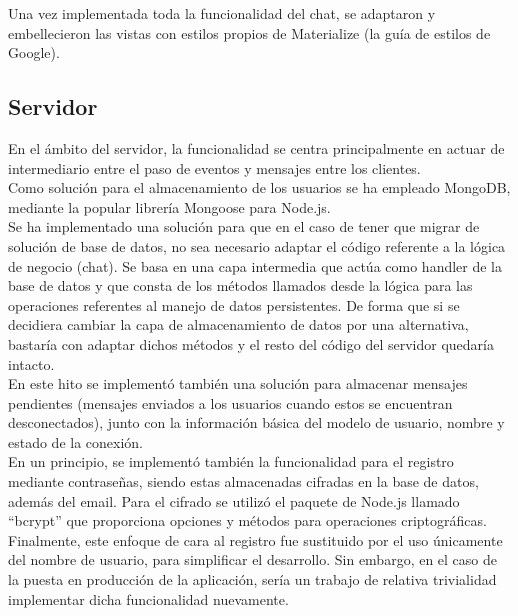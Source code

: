 Una vez implementada toda la funcionalidad del chat, se adaptaron y embellecieron las vistas con estilos propios de Materialize \cite{MaterializeGoogle} (la guía de estilos de Google). \\

\subsection{Servidor}

En el ámbito del servidor, la funcionalidad se centra principalmente en actuar de intermediario entre el paso de eventos y mensajes entre los clientes. \\ 

Como solución para el almacenamiento de los usuarios se ha empleado MongoDB, mediante la popular librería Mongoose para Node.js. \\

Se ha implementado una solución para que en el caso de tener que migrar de solución de base de datos, no sea necesario adaptar el código referente a la lógica de negocio (chat). Se basa en una capa intermedia que actúa como handler de la base de datos y que consta de los métodos llamados desde la lógica para las operaciones referentes al manejo de datos persistentes. De forma que si se decidiera cambiar la capa de almacenamiento de datos por una alternativa, bastaría con adaptar dichos métodos y el resto del código del servidor quedaría intacto. \\ 

En este hito se implementó también una solución para almacenar mensajes pendientes (mensajes enviados a los usuarios cuando estos se encuentran desconectados), junto con la información básica del modelo de usuario, nombre y estado de la conexión. \\

En un principio, se implementó también la funcionalidad para el registro mediante contraseñas, siendo estas almacenadas cifradas en la base de datos, además del email. Para el cifrado se utilizó el paquete de Node.js llamado \hyphenquote{spanish}{bcrypt} que proporciona opciones y métodos para operaciones criptográficas. Finalmente, este enfoque de cara al registro fue sustituido por el uso únicamente del nombre de usuario, para simplificar el desarrollo. Sin embargo, en el caso de la puesta en producción de la aplicación, sería un trabajo de relativa trivialidad implementar dicha funcionalidad nuevamente. \\

